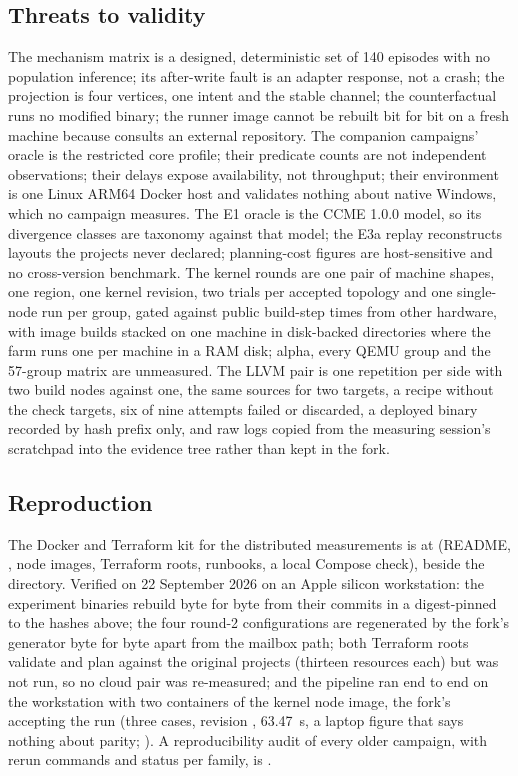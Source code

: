 \subsection{Threats to validity}
\label{sec:eval:threats}

The mechanism matrix is a designed, deterministic set of 140 episodes with no
population inference; its after-write fault is an adapter response, not a
crash; the projection is four vertices, one intent and the stable channel;
the counterfactual runs no modified binary; the runner image cannot be
rebuilt bit for bit on a fresh machine because  consults an
external repository. The companion campaigns' oracle is the restricted core
profile; their predicate counts are not independent observations; their
delays expose availability, not throughput; their environment is one Linux
ARM64 Docker host and validates nothing about native Windows, which no
campaign measures. The E1 oracle is the CCME 1.0.0 model, so its divergence
classes are taxonomy against that model; the E3a replay reconstructs layouts
the projects never declared; planning-cost figures are host-sensitive and
no cross-version benchmark. The kernel rounds are one pair of machine shapes,
one region, one kernel revision, two trials per accepted topology and one
single-node run per group, gated against public build-step times from other
hardware, with image builds stacked on one machine in disk-backed directories
where the farm runs one per machine in a RAM disk; alpha, every QEMU group and the 57-group matrix are unmeasured. The
LLVM pair is one repetition per side with two build nodes against one, the
same sources for two targets, a recipe without the check targets, six of nine
attempts failed or discarded, a deployed binary recorded by hash prefix only,
and raw logs copied from the measuring session's scratchpad into the evidence
tree rather than kept in the fork.

\subsection{Reproduction}
\label{sec:eval:repro}

The Docker and Terraform kit for the distributed measurements is at
 (README, , node
images, Terraform roots, runbooks, a local Compose check), beside the
 directory. Verified on 22 September 2026 on an Apple
silicon workstation: the experiment binaries rebuild byte for byte from their
commits in a digest-pinned  to the hashes above;
the four round-2 configurations are regenerated by the fork's generator byte
for byte apart from the mailbox path; both Terraform roots validate and plan
against the original projects (thirteen resources each) but  was not run, so no cloud pair was re-measured; and the pipeline ran end
to end on the workstation with two containers of the kernel node image, the
fork's  accepting the run (three cases, revision
, 63.47~s, a laptop figure that says nothing about parity;
). A reproducibility
audit of every older campaign, with rerun commands and status per family, is
.
